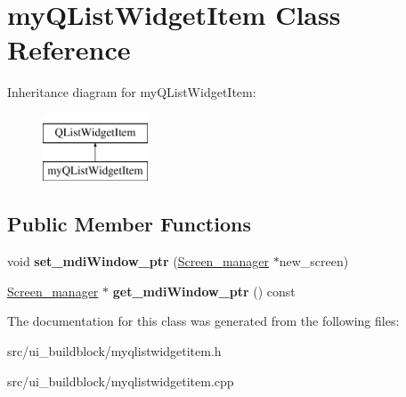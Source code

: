 \hypertarget{classmyQListWidgetItem}{}\section{my\+Q\+List\+Widget\+Item Class Reference}
\label{classmyQListWidgetItem}
Inheritance diagram for my\+Q\+List\+Widget\+Item\+:\begin{figure}[H]
\begin{center}
\leavevmode
\includegraphics[height=2.000000cm]{classmyQListWidgetItem}
\end{center}
\end{figure}
\subsection*{Public Member Functions}
\begin{DoxyCompactItemize}
\item 
\mbox{\label{classmyQListWidgetItem_ad4ae475527f8e96cd41a2f2e91fddd99}} 
void {\bfseries set\+\_\+mdi\+Window\+\_\+ptr} (\mbox{\hyperlink{classScreen__manager}{Screen\+\_\+manager}} $\ast$new\+\_\+screen)
\item 
\mbox{\label{classmyQListWidgetItem_a33ca8234a762bc4f8b7114228d0ea2f3}} 
\mbox{\hyperlink{classScreen__manager}{Screen\+\_\+manager}} $\ast$ {\bfseries get\+\_\+mdi\+Window\+\_\+ptr} () const
\end{DoxyCompactItemize}


The documentation for this class was generated from the following files\+:\begin{DoxyCompactItemize}
\item 
src/ui\+\_\+buildblock/myqlistwidgetitem.\+h\item 
src/ui\+\_\+buildblock/myqlistwidgetitem.\+cpp\end{DoxyCompactItemize}
